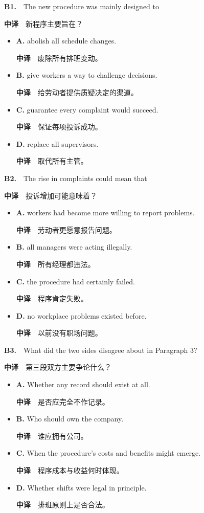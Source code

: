 \documentclass[
  11pt,
]{ctexart}
\begin{document}
\textbf{B1.}　The new procedure was mainly designed to

\textbf{中译}　新程序主要旨在？

\begin{itemize}
\item
  \textbf{A.} abolish all schedule changes.

  \textbf{中译}　废除所有排班变动。
\item
  \textbf{B.} give workers a way to challenge decisions.

  \textbf{中译}　给劳动者提供质疑决定的渠道。
\item
  \textbf{C.} guarantee every complaint would succeed.

  \textbf{中译}　保证每项投诉成功。
\item
  \textbf{D.} replace all supervisors.

  \textbf{中译}　取代所有主管。
\end{itemize}

\textbf{B2.}　The rise in complaints could mean that

\textbf{中译}　投诉增加可能意味着？

\begin{itemize}
\item
  \textbf{A.} workers had become more willing to report problems.

  \textbf{中译}　劳动者更愿意报告问题。
\item
  \textbf{B.} all managers were acting illegally.

  \textbf{中译}　所有经理都违法。
\item
  \textbf{C.} the procedure had certainly failed.

  \textbf{中译}　程序肯定失败。
\item
  \textbf{D.} no workplace problems existed before.

  \textbf{中译}　以前没有职场问题。
\end{itemize}

\textbf{B3.}　What did the two sides disagree about in Paragraph 3?

\textbf{中译}　第三段双方主要争论什么？

\begin{itemize}
\item
  \textbf{A.} Whether any record should exist at all.

  \textbf{中译}　是否应完全不作记录。
\item
  \textbf{B.} Who should own the company.

  \textbf{中译}　谁应拥有公司。
\item
  \textbf{C.} When the procedure's costs and benefits might emerge.

  \textbf{中译}　程序成本与收益何时体现。
\item
  \textbf{D.} Whether shifts were legal in principle.

  \textbf{中译}　排班原则上是否合法。
\end{itemize}
\end{document}
